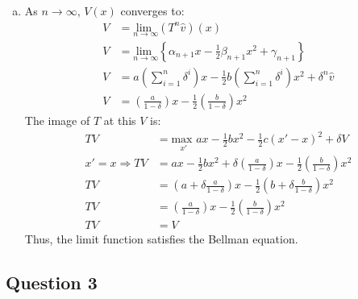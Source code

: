 \documentclass{article}
\newcommand{\usmax}[1]{\underset{#1}{\text{max }}}
\newcommand{\vhat}{\hat{v}}
\begin{document}
\begin{enumerate}[(a)]
	\item As $n\rightarrow\infty$, $V(x)$ converges to:
		\begin{align*}
			V &= \underset{n\rightarrow\infty}{\text{lim }}(T^{n}\vhat)(x) 	\\
			V &= \underset{n\rightarrow\infty}{\text{lim }}\left\{ \alpha_{n+1}x - \frac{1}{2}\beta_{n+1}x^2 + \gamma_{n+1} \right\}	\\
			V &= a\left(\sum^n_{i=1}\delta^i\right)x - \frac{1}{2}b\left(\sum^n_{i=1}\delta^i\right)x^2 + \delta^n\vhat	\\
			V &= \left(\frac{a}{1-\delta}\right)x-\frac{1}{2}\left(\frac{b}{1-\delta}\right)x^2
		\end{align*}
		The image of $T$ at this $V$ is:
		\begin{align*}
			TV &= \usmax{x'}ax-\frac{1}{2}bx^2 - \frac{1}{2}c(x'-x)^2 + \delta V	\\
			x'=x \Rightarrow TV &= ax-\frac{1}{2}bx^2 + \delta \left(\frac{a}{1-\delta}\right)x-\frac{1}{2}\left(\frac{b}{1-\delta}\right)x^2	\\
			TV &= \left(a + \delta\frac{a}{1-\delta}\right)x-\frac{1}{2}\left(b + \delta\frac{b}{1-\delta}\right)x^2	\\
			TV &= \left(\frac{a}{1-\delta}\right)x-\frac{1}{2}\left(\frac{b}{1-\delta}\right)x^2	\\
			TV &= V
		\end{align*}
		Thus, the limit function satisfies the Bellman equation.
	
\end{enumerate}

\subsection*{Question 3}
\end{document}
